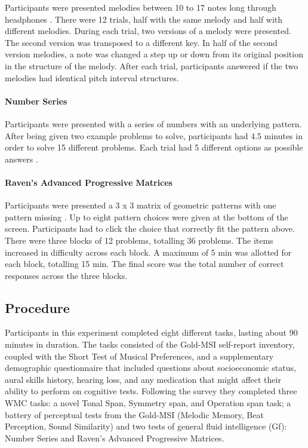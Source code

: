\documentclass[]{book}
\let\oldparagraph\paragraph
\renewcommand{\paragraph}[1]{\oldparagraph{#1}\mbox{}}
\begin{document}
Participants were presented melodies between 10 to 17 notes long through headphones \citep{mullensiefenMusicalityNonMusiciansIndex2014}.
There were 12 trials, half with the same melody and half with different melodies.
During each trial, two versions of a melody were presented.
The second version was transposed to a different key.
In half of the second version melodies, a note was changed a step up or down from its original position in the structure of the melody.
After each trial, participants answered if the two melodies had identical pitch interval structures.

\hypertarget{number-series}{%
\paragraph{Number Series}\label{number-series}}

Participants were presented with a series of numbers with
an underlying pattern.
After being given two example problems to solve, participants had 4.5 minutes in order to solve 15 different problems.
Each trial had 5 different options as possible answers \citep{thurstonePrimaryMentalAbilities1938}.

\hypertarget{ravens-advanced-progressive-matrices}{%
\paragraph{Raven's Advanced Progressive Matrices}\label{ravens-advanced-progressive-matrices}}

Participants were presented a 3 x 3 matrix of geometric patterns with one pattern missing \citep{ravenManualRavenProgressive1994}. Up to eight pattern choices were given at the bottom of the screen.
Participants had to click the choice that correctly fit the pattern above.
There were three blocks of 12 problems, totalling 36 problems.
The items increased in difficulty across each block.
A maximum of 5 min was allotted for each block, totalling 15 min.
The final score was the total number of correct responses across the three blocks.

\hypertarget{procedure}{%
\subsection{Procedure}\label{procedure}}

Participants in this experiment completed eight different tasks, lasting about 90 minutes in duration.
The tasks consisted of the Gold-MSI self-report inventory, coupled with the Short Test of Musical Preferences, and a supplementary demographic questionnaire that included questions about socioeconomic status, aural skills history, hearing loss, and any medication that might affect their ability to perform on cognitive tests.
Following the survey they completed three WMC tasks: a novel Tonal Span, Symmetry span, and Operation span task; a battery of perceptual tests from the Gold-MSI (Melodic Memory, Beat Perception, Sound Similarity) and two tests of general fluid intelligence (Gf): Number Series and Raven's Advanced Progressive Matrices.
\end{document}

